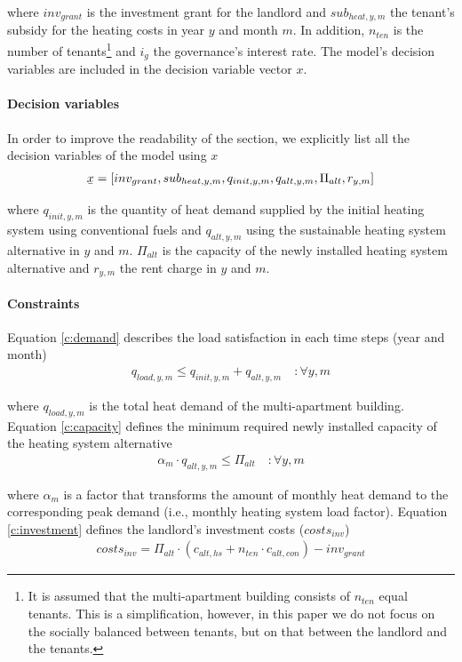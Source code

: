 where $inv_{grant}$ is the investment grant for the landlord and $sub_{heat,y,m}$ the tenant's subsidy for the heating costs in year $y$ and month $m$. In addition, $n_{ten}$ is the number of tenants\footnote{It is assumed that the multi-apartment building consists of $n_{ten}$ equal tenants. This is a simplification, however, in this paper we do not focus on the socially balanced between tenants, but on that between the landlord and the tenants.} and $i_g$ the governance's interest rate. The model's decision variables are included in the decision variable vector $x$.

\paragraph{Decision variables}
In order to improve the readability of the section, we explicitly list all the decision variables of the model using $x$
\begin{align}
\b{$x$}=[inv_{grant}, sub_{heat,y,m}, q_{init,y,m}, q_{alt,y,m}, \Pi_{alt}, r_{y,m}]
\end{align}

where $q_{init,y,m}$ is the quantity of heat demand supplied by the initial heating system using conventional fuels and $q_{alt,y,m}$ using the sustainable heating system alternative in $y$ and $m$. $\Pi_{alt}$ is the capacity of the newly installed heating system alternative and $r_{y,m}$ the rent charge in $y$ and $m$.

\paragraph{Constraints} Equation \ref{c:demand} describes the load satisfaction in each time steps (year and month) 
\begin{align}\label{c:demand}
q_{load,y,m} \leq q_{init,y,m} + q_{alt,y,m} \quad :\forall y,m
\end{align}

where $q_{load,y,m}$ is the total heat demand of the multi-apartment building. Equation \ref{c:capacity} defines the minimum required newly installed capacity of the heating system alternative
\begin{align}\label{c:capacity}
\alpha_{m} \cdot q_{alt,y,m} \leq \Pi_{alt} \quad :\forall y,m
\end{align}

where $\alpha_{m}$ is a factor that transforms the amount of monthly heat demand to the corresponding peak demand (i.e., monthly heating system load factor). Equation \ref{c:investment} defines the landlord's investment costs ($costs_{inv}$)
\begin{align}\label{c:investment}
costs_{inv} = \Pi_{alt} \cdot (c_{alt,hs} + n_{ten} \cdot c_{alt,con}) - inv_{grant}
\end{align}

